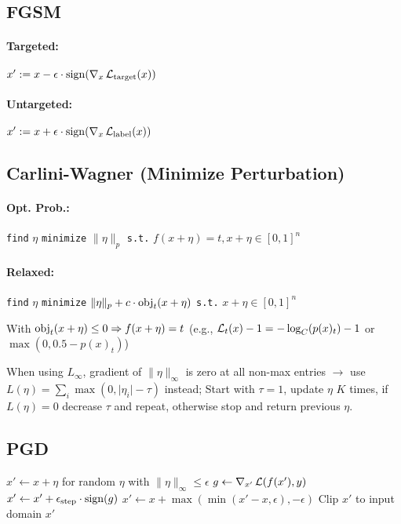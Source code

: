 \subsection*{FGSM}
\paragraph{Targeted:} 
$x' := x - \epsilon \cdot \operatorname{sign}(\nabla_x \operatorname{\mathcal{L}}_\text{target}(x))$

\paragraph{Untargeted:}
$x' := x + \epsilon \cdot \operatorname{sign}(\nabla_x \operatorname{\mathcal{L}}_\text{label}(x))$

\subsection*{Carlini-Wagner (Minimize Perturbation)}
\paragraph{Opt. Prob.:} \texttt{find} $\eta$ \texttt{minimize} $\|\eta\|_p$ \texttt{s.t.} $f(x+\eta) =t, x+\eta \in [0,1]^n$
\paragraph{Relaxed:} \texttt{find} $\eta$ \texttt{minimize} $\|\eta\|_p + c \cdot \operatorname{obj}_t(x+\eta)$ \texttt{s.t.} $x+\eta \in [0,1]^n$

With $\operatorname{obj}_t(x+\eta) \le 0 \Rightarrow f(x+\eta) = t$ (e.g., $\operatorname{\mathcal{L}}_t(x) - 1 = -\log_C(p(x)_t) - 1$ or $\max(0, 0.5- p(x)_t)$)

When using $L_\infty$, gradient of $\|\eta\|_\infty$ is zero at all non-max entries $\rightarrow$ use $L(\eta) = \sum_i \max(0, \lvert \eta_i \rvert - \tau)$ instead; Start with $\tau=1$, update $\eta$ $K$ times, if $L(\eta) = 0$ decrease $\tau$ and repeat, otherwise stop and return previous $\eta$. 

\subsection*{PGD}

\begin{algorithmic}
\State $x' \gets x + \eta$ for random $\eta$ with $\|\eta\|_\infty \le \epsilon$
    \State $g \gets \nabla_{x'} \operatorname{\mathcal{L}}(f(x'), y)$ 
    \State $x' \gets x' +  \epsilon_\text{step} \cdot \operatorname{sign}(g)$ 
    \State $x' \gets x + \max(\min(x'-x, \epsilon), -\epsilon)$
    \State Clip $x'$ to input domain 
\EndFor
\State \Return $x'$
\EndFunction
\end{algorithmic}


